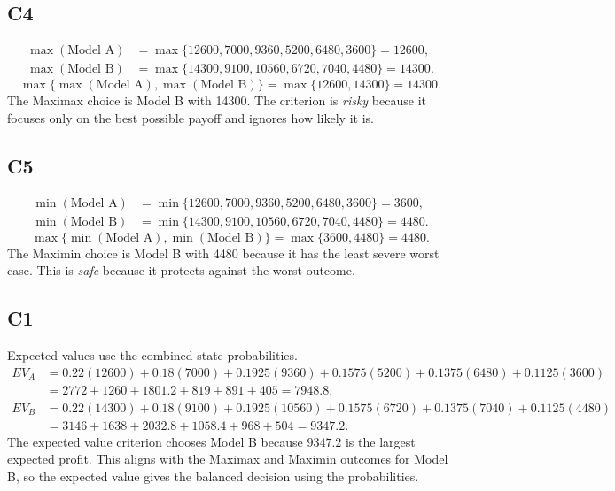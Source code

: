 \begin{ExamProblems}
		\subsection*{C4}
		\[
		\begin{aligned}
		\max(\text{Model A}) &= \max\{12600,7000,9360,5200,6480,3600\} = 12600,\\
		\max(\text{Model B}) &= \max\{14300,9100,10560,6720,7040,4480\} = 14300.
		\end{aligned}
		\]
		\[
		\max\{\max(\text{Model A}), \max(\text{Model B})\}
		= \max\{12600, 14300\}
		= 14300.
		\]
		The Maximax choice is Model B with 14300. The criterion is \emph{risky} because it focuses only on the best possible payoff and ignores how likely it is.

		\subsection*{C5}
		\[
		\begin{aligned}
		\min(\text{Model A}) &= \min\{12600,7000,9360,5200,6480,3600\} = 3600,\\
		\min(\text{Model B}) &= \min\{14300,9100,10560,6720,7040,4480\} = 4480.
		\end{aligned}
		\]
		\[
		\max\{\min(\text{Model A}), \min(\text{Model B})\}
		= \max\{3600, 4480\}
		= 4480.
		\]
		The Maximin choice is Model B with 4480 because it has the least severe worst case. This is \emph{safe} because it protects against the worst outcome.

		\subsection*{C1}
		Expected values use the combined state probabilities.
		\[
		\begin{aligned}
		EV_A &= 0.22(12600)+0.18(7000)+0.1925(9360)+0.1575(5200)+0.1375(6480)+0.1125(3600)\\
		&= 2772+1260+1801.2+819+891+405=7948.8,\\
		EV_B &= 0.22(14300)+0.18(9100)+0.1925(10560)+0.1575(6720)+0.1375(7040)+0.1125(4480)\\
		&= 3146+1638+2032.8+1058.4+968+504=9347.2.
		\end{aligned}
		\]
		The expected value criterion chooses Model B because $9347.2$ is the largest expected profit. This aligns with the Maximax and Maximin outcomes for Model B, so the expected value gives the balanced decision using the probabilities.


\end{ExamProblems}
